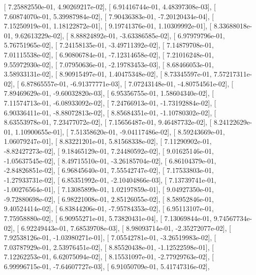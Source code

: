 \documentclass{article}
\begin{document}
       [  7.25882550e-01,   4.90269217e-02],
       [  6.91416744e-01,   4.48397308e-03],
       [  7.60874070e-01,   5.39987984e-02],
       [  7.90436383e-01,  -7.20120434e-04],
       [  7.15250919e-01,   1.18122872e-01],
       [  9.19741376e-01,   1.10309992e-01],
       [  8.33688018e-01,   9.62613229e-02],
       [  8.88824892e-01,  -3.63386585e-02],
       [  6.97979796e-01,   5.76751965e-02],
       [  7.24158135e-01,  -3.49711392e-02],
       [  7.14879708e-01,   7.01115538e-02],
       [  6.90806784e-01,  -7.12314658e-02],
       [  7.21016248e-01,   9.55972930e-02],
       [  7.07950636e-01,  -2.19783453e-03],
       [  8.68466053e-01,   3.58933131e-02],
       [  8.90915497e-01,   1.40475348e-02],
       [  8.73345597e-01,   7.57217311e-02],
       [  6.87865557e-01,  -6.91377771e-03],
       [  7.07243148e-01,  -4.80754561e-02],
       [  7.89469629e-01,  -9.60032820e-03],
       [  6.95356755e-01,   1.58604340e-02],
       [  7.11574713e-01,  -6.08933092e-02],
       [  7.24766913e-01,  -1.73192884e-02],
       [  6.90336411e-01,  -8.88072813e-02],
       [  8.85684351e-01,  -1.10780302e-02],
       [  8.63553978e-01,   7.23477072e-02],
       [  7.15656487e-01,   9.46487732e-02],
       [  8.24122629e-01,   1.10900655e-01],
       [  7.51358620e-01,  -9.04117486e-02],
       [  8.59243669e-01,   1.06079247e-01],
       [  8.83221201e-01,   5.81568338e-02],
       [  7.11290902e-01,  -8.82427273e-02],
       [  9.18465129e-01,   7.24480592e-02],
       [  9.01625146e-01,  -1.05637545e-02],
       [  8.49715510e-01,  -3.26185704e-02],
       [  6.86104379e-01,  -2.84826851e-02],
       [  6.96845640e-01,   7.55542747e-02],
       [  7.17533803e-01,  -1.27933731e-02],
       [  6.85351992e-01,  -2.10404866e-03],
       [  7.13739741e-01,  -1.00276564e-01],
       [  7.13085899e-01,   1.02197859e-01],
       [  9.04927350e-01,  -9.72880698e-02],
       [  6.98221008e-01,   2.85126055e-02],
       [  8.58952846e-01,   9.40524414e-02],
       [  6.83844206e-01,  -7.95784353e-02],
       [  6.95113107e-01,   7.75958880e-02],
       [  6.90955271e-01,   5.73820431e-04],
       [  7.13069844e-01,   9.74567734e-02],
       [  6.92249443e-01,   7.68539708e-03],
       [  8.98093714e-01,  -2.35272077e-02],
       [  7.92538126e-01,  -1.03980271e-01],
       [  7.05542781e-01,  -3.26519983e-02],
       [  7.03787929e-01,   2.53976451e-02],
       [  8.85520438e-01,  -1.12522598e-01],
       [  7.12262253e-01,   6.62075094e-02],
       [  8.15531097e-01,  -2.77929763e-02],
       [  6.99996715e-01,  -7.64607727e-03],
       [  6.91050709e-01,   5.41747316e-02],
\end{document}
